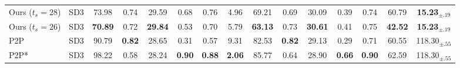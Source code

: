\begin{table}[htbp]
\begin{tabular}{lc||ccc|ccc||ccc|ccc||c}
        \hline
        \rowcolor{green!10} Ours ($t_s=28$)  & SD3                                        & 73.98                                        & 0.74                                 & 29.59                                & 0.68                                 & 0.76                  & 4.96            & 69.21            & 0.69            & 30.09           & 0.39              & 0.74              & 60.79           & \textbf{15.23}$_{\pm\text{.19}}$ \\
        \rowcolor{green!10} Ours ($t_s=26$)  & SD3                                        & \textbf{ 70.89}                              & 0.72                                 & \textbf{29.84}                       & 0.53                                 & 0.70                  & 5.79            & \textbf{63.13}   & 0.73            & \textbf{30.61}  & 0.41              & 0.75              & \textbf{42.52}  & \textbf{15.23}$_{\pm\text{.19}}$ \\
        \rowcolor{green!10} P2P              & SD3                                        & 90.79                                        & \textbf{0.82}                        & 28.65                                & 0.31                                 & 0.57                  & 9.31            & 82.53            & \textbf{0.82}   & 29.13           & 0.29              & 0.71              & 60.55           & 118.30$_{\pm\text{.55}}$         \\
        \rowcolor{green!10} P2P*             & SD3                                        & 98.22                                        & 0.58                                 & 28.24                                & \textbf{0.90}                        & \textbf{0.88}         & \textbf{2.06}   & 85.77            & 0.64            & 28.90           & \textbf{0.66}     & \textbf{0.90}     & 62.59           & 118.30$_{\pm\text{.55}}$         \\
        \bottomrule
    \end{tabular}
    \label{tab:p2p}
\end{table}
\addtolength{\tabcolsep}{\mycolspace}

